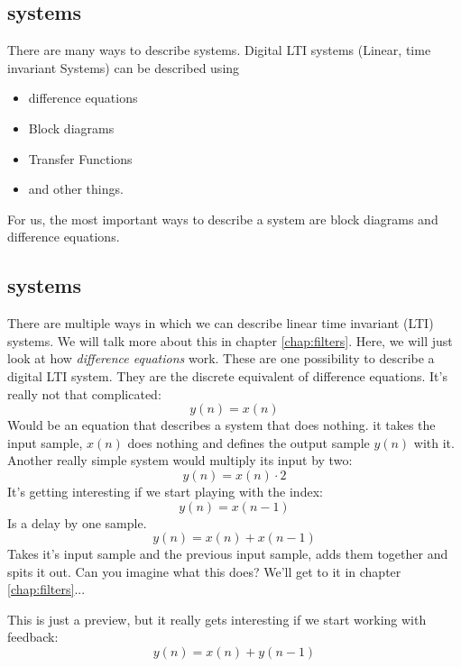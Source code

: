 \subsection{systems}
There are many ways to describe systems. Digital LTI systems (Linear, time invariant Systems) can be described using
\begin{itemize}
	\item difference equations
	\item Block diagrams
	\item Transfer Functions
	\item and other things.
\end{itemize}

For us, the most important ways to describe a system are block diagrams and difference equations.

\subsection{systems}

There are multiple ways in which we can describe linear time invariant (LTI) systems. We will talk more about this in chapter \ref{chap:filters}. Here, we will just look at how \textit{difference equations} work. These are one possibility to describe a digital LTI system. They are the discrete equivalent of difference equations. It's really not that complicated:
\begin{equation}
	y(n) = x(n)
\end{equation}
Would be an equation that describes a system that does nothing. it takes the input sample, $x(n)$ does nothing and defines the output sample $y(n)$ with it.
Another really simple system would multiply its input by two:
\begin{equation}
	y(n) = x(n)\cdot 2
\end{equation}
It's getting interesting if we start playing with the index:
\begin{equation}
	y(n) = x(n-1)
\end{equation}
Is a delay by one sample.
\begin{equation}
	y(n) = x(n)+x(n-1)
\end{equation}
Takes it's input sample and the previous input sample, adds them together and spits it out. Can you imagine what this does? We'll get to it in chapter \ref{chap:filters}...

This is just a preview, but it really gets interesting if we start working with feedback:
\begin{equation}
 	y(n) = x(n)+y(n-1)
 \end{equation}


